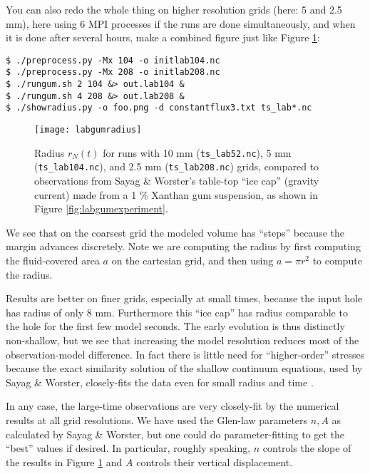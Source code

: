 You can also redo the whole thing on higher resolution grids (here: 5 and 2.5 mm), here using 6 MPI processes if the runs are done simultaneously, and when it is done after several hours, make a combined figure just like Figure \ref{fig:labgumresult}:
\begin{verbatim}
$ ./preprocess.py -Mx 104 -o initlab104.nc
$ ./preprocess.py -Mx 208 -o initlab208.nc
$ ./rungum.sh 2 104 &> out.lab104 &
$ ./rungum.sh 4 208 &> out.lab208 &
$ ./showradius.py -o foo.png -d constantflux3.txt ts_lab*.nc
\end{verbatim}

\begin{figure}[ht]
\centering
\texttt{[image: labgumradius]}
\caption{Radius $r_N(t)$ for runs with 10 mm (\texttt{ts_lab52.nc}), 5 mm (\texttt{ts_lab104.nc}), and 2.5 mm (\texttt{ts_lab208.nc}) grids, compared to observations from Sayag \& Worster's \cite{SayagWorster2013} table-top ``ice cap'' (gravity current) made from a 1 \% Xanthan gum suspension, as shown in Figure \ref{fig:labgumexperiment}.}
\label{fig:labgumresult}
\end{figure}

We see that on the coarsest grid the modeled volume has ``steps'' because the margin advances discretely.  Note we are computing the radius by first computing the fluid-covered area $a$ on the cartesian grid, and then using $a=\pi r^2$ to compute the radius.

Results are better on finer grids, especially at small times, because the input hole has radius of only 8 mm.  Furthermore this ``ice cap'' has radius comparable to the hole for the first few model seconds.  The early evolution is thus distinctly non-shallow, but we see that increasing the model resolution reduces most of the observation-model difference.  In fact there is little need for ``higher-order'' stresses because the exact similarity solution of the shallow continuum equations, used by Sayag \& Worster, closely-fits the data even for small radius and time \cite[Figure 4]{SayagWorster2013}.

In any case, the large-time observations are very closely-fit by the numerical results at all grid resolutions.  We have used the Glen-law parameters $n,A$ as calculated by Sayag \& Worster, but one could do parameter-fitting to get the ``best'' values if desired.  In particular, roughly speaking, $n$ controls the slope of the results in Figure \ref{fig:labgumresult} and $A$ controls their vertical displacement.


